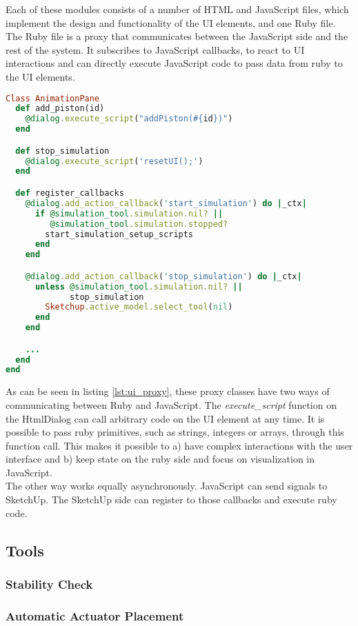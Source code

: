 Each of these modules consists of a number of HTML and JavaScript files, which implement the design and functionality of the UI elements, and one Ruby file. The Ruby file is a proxy that communicates between the JavaScript side and the rest of the system. It subscribes to JavaScript callbacks, to react to UI interactions and can directly execute JavaScript code to pass data from ruby to the UI elements.
\begin{lstlisting}[language=Ruby, label={lst:ui_proxy}, caption=excerpt from UI callbacks]
Class AnimationPane
  def add_piston(id)
    @dialog.execute_script("addPiston(#{id})")
  end

  def stop_simulation
    @dialog.execute_script('resetUI();')
  end

  def register_callbacks
    @dialog.add_action_callback('start_simulation') do |_ctx|
      if @simulation_tool.simulation.nil? ||
         @simulation_tool.simulation.stopped?
        start_simulation_setup_scripts
      end
    end

    @dialog.add_action_callback('stop_simulation') do |_ctx|
      unless @simulation_tool.simulation.nil? ||
             stop_simulation
        Sketchup.active_model.select_tool(nil)
      end
    end

    ...
  end
end
\end{lstlisting}
As can be seen in listing \ref{lst:ui_proxy}, these proxy classes have two ways of communicating between Ruby and JavaScript. The \textit{execute\_script} function on the HtmlDialog can call arbitrary code on the UI element at any time. It is possible to pass ruby primitives, such as strings, integers or arrays, through this function call. This makes it possible to a) have complex interactions with the user interface and b) keep state on the ruby side and focus on visualization in JavaScript.\\
The other way works equally asynchronously. JavaScript can send signals to SketchUp. The SketchUp side can register to those callbacks and execute ruby code.

\subsection{Tools}

\subsubsection{Stability Check}

\subsubsection{Automatic Actuator Placement}

